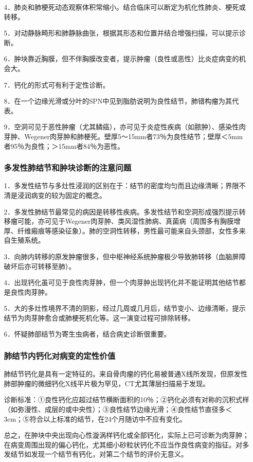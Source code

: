 4．肺炎和肺梗死动态观察体积常缩小。结合临床可以断定为机化性肺炎、梗死或转移。

5．对动静脉畸形和肺静脉曲张，根据其形态和位置并结合增强扫描，可以提示诊断。

6．肿块靠近胸膜，但不伴胸膜改变者，提示肿瘤（良性或恶性）比炎症病变的机会大。

7．钙化的形式可有利于定性诊断。

8．在一个边缘光滑或分叶的SPN中见到脂肪说明为良性结节，肺错构瘤为其代表。

9．空洞可见于恶性肿瘤（尤其鳞癌），亦可见于炎症性疾病（如脓肿）、感染性肉芽肿、Wegener肉芽肿和肺梗死。壁厚5～15mm者73％为良性结节；壁厚＜5mm者95％为良性；＞15mm者84％为恶性。

\subsubsection{多发性肺结节和肿块诊断的注意问题}

1．多发性结节与多灶性浸润的区别在于：结节的密度均匀而且边缘清晰；界限不清是浸润病变的较为固定的概念。

2．多发性肺结节最常见的病因是转移性疾病。多发性结节和空洞形成强烈提示转移瘤可能，亦可见于Wegener肉芽肿、类风湿性肺病、真菌病（周围多有胸膜增厚、纤维瘢痕等感染征象）。肺的空洞性转移，男性最可能来自头颈部，女性多来自生殖系统。

3．向肺内转移的原发肿瘤很多，但中枢神经系统肿瘤极少导致肺转移（血脑屏障破坏后亦可转移至肺）。

4．出现钙化虽可见于良性肉芽肿，但一个肉芽肿出现钙化并不能证明其他结节都是良性肉芽肿。

5．大的多灶性境界不清的阴影，经过几周或几月后，结节变小、边缘清晰，提示结节为肉芽肿愈合或肺梗死机化等。这一演变过程可排除转移。

6．怀疑肺部结节为寄生虫病者，结合病史诊断很重要。

\subsubsection{肺结节内钙化对病变的定性价值}

肺结节钙化是具有一定特征的。来自骨肉瘤的钙化易被普通X线所发现，但原发性肺部肿瘤的微细钙化X线平片极为罕见，CT尤其薄层扫描易于发现。

诊断标准：①良性钙化应超过结节横断面积的10％；②钙化必须有对称的沉积式样（如弥漫性、成层的或中央性）；③良性结节边缘光滑；④良性结节直径多＜3cm；⑤符合以上标准的结节，在24个月随访中不应有变化。

总之，在肿块中央出现向心性漩涡样钙化或全部钙化，实际上已可诊断为肉芽肿；在病变周围出现的偏心钙化，尤其细小砂粒状钙化不应当作良性病变的指征。对多发结节如发现一个结节有钙化，对第二个结节的评价无意义。

